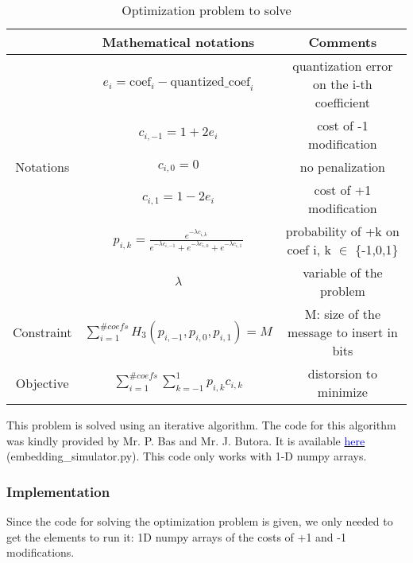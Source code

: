 \documentclass[12pt]{article}
\begin{document}
\begin{table}[H]
\begin{tabular}{ |c|c|c| }
    \hline
    & Mathematical notations & Comments\\
    \hline
    & $e_i = \text{coef}_i - \text{quantized\_coef}_i$ & quantization error on the i-th coefficient\\ 
    & $c_{i,-1} = 1 + 2e_i$ & cost of -1 modification\\ 
    Notations & $c_{i,0} = 0$ & no penalization\\
    & $c_{i,1} = 1 - 2e_i$ & cost of +1 modification\\
    & $p_{i,k} = \frac{e^{-\lambda c_{i,k}}}{e^{-\lambda c_{i,-1}} + e^{-\lambda c_{i,0}} + e^{-\lambda c_{i,1}}}$ & probability of +k on coef i, k $\in$ \{-1,0,1\}\\
    & $\lambda$ & variable of the problem\\
    \hline
    Constraint & $\displaystyle\sum_{i=1}^{\# coefs}{H_3(p_{i,-1},p_{i,0},p_{i,1})} = M$ & M: size of the message to insert in bits\\
    \hline
    Objective & $\displaystyle\sum_{i=1}^{\# coefs}{\sum_{k=-1}^{1}{p_{i,k}c_{i,k}}}$ & distorsion to minimize \\ 
    \hline
\end{tabular}
\caption[Side information]{Optimization problem to solve}
\end{table}

This problem is solved using an iterative algorithm. The code for this algorithm was kindly provided by Mr. P. Bas and Mr. J. Butora. It is available \href{https://janbutora.github.io/downloads/}{\textcolor{blue}{here}} (embedding\_simulator.py). This code only works with 1-D numpy arrays.

\subsubsection{Implementation}
Since the code for solving the optimization problem is given, we only needed to get the elements to run it: 1D numpy arrays of the costs of +1 and -1 modifications.
\end{document}
